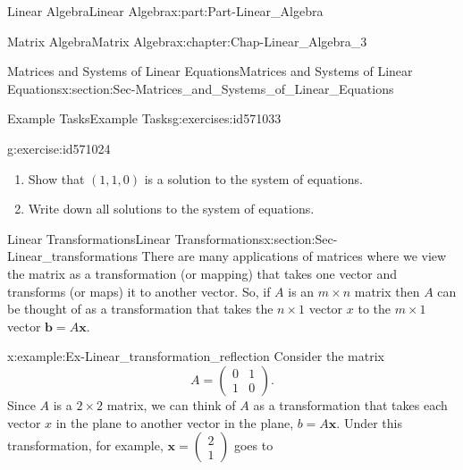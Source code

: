 \documentclass[oneside,10pt,]{book}
\numberwithin{equation}{section}
\newcommand{\amp}{&}
\begin{document}
\begin{partptx}{Linear Algebra}{}{Linear Algebra}{}{}{x:part:Part-Linear_Algebra}
\begin{chapterptx}{Matrix Algebra}{}{Matrix Algebra}{}{}{x:chapter:Chap-Linear_Algebra_3}
\begin{sectionptx}{Matrices and Systems of Linear Equations}{}{Matrices and Systems of Linear Equations}{}{}{x:section:Sec-Matrices_and_Systems_of_Linear_Equations}
\begin{exercises-subsection-numberless}{Example Tasks}{}{Example Tasks}{}{}{g:exercises:id571033}
\begin{divisionexercise}{1}{}{}{g:exercise:id571024}
\begin{enumerate}[label=\alph*]
\begin{equation*}
A=\begin{pmatrix}1 \amp -1 \amp -1 \\ 0 \amp 1 \amp 3 \\ 2 \amp -1 \amp 1\end{pmatrix}, \quad \mathbf{u} = \begin{pmatrix}2 \\ 3 \\ -1\end{pmatrix}\text{.}
\end{equation*}
%
\item{}Show that \((1,1,0)\) is a solution to the system of equations.%
\item{}Write down all solutions to the system of equations.%
\end{enumerate}
%
\end{divisionexercise}%
\end{exercises-subsection-numberless}
\end{sectionptx}
%
%
\typeout{************************************************}
\typeout{************************************************}
%
\begin{sectionptx}{Linear Transformations}{}{Linear Transformations}{}{}{x:section:Sec-Linear_transformations}
There are many applications of matrices where we view the matrix as a transformation (or mapping) that takes one vector and transforms (or maps) it to another vector. So, if \(A\) is an \(m \times n\) matrix then \(A\) can be thought of as a transformation that takes the \(n \times 1\) vector \(x\) to the \(m \times 1\) vector \(\mathbf{b} = A\mathbf{x}\).%
\begin{example}{}{x:example:Ex-Linear_transformation_reflection}%
Consider the matrix%
\begin{equation*}
A = \begin{pmatrix} 0 \amp 1 \\ 1 \amp 0\end{pmatrix}.
\end{equation*}
Since \(A\) is a \(2 \times 2\) matrix, we can think of \(A\) as a transformation that takes each vector \(x\) in the plane to another vector in the plane, \(b = A\mathbf{x}\). Under this transformation, for example, \(\mathbf{x} = \begin{pmatrix} 2 \\ 1 \end{pmatrix}\) goes to%
\begin{equation*}

\end{equation*}
\end{example}
\end{sectionptx}
\end{chapterptx}
\end{partptx}
\end{document}
